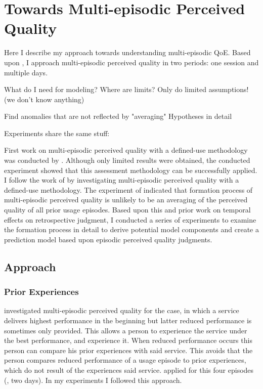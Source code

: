 \chapter{Towards Multi-episodic Perceived Quality}\label{chap:towards}
\begin{chapter-abstract}
Here I describe my approach towards understanding multi-episodic QoE.
Based upon \cite{moller_single-call_2011}, I approach multi-episodic perceived quality in two periods: one session and multiple days.

What do I need for modeling?
Where are limits?
Only do limited assumptions! (we don't know anything)

Find anomalies that are not reflected by "averaging"
Hypotheses in detail

Experiments share the same stuff:
\end{chapter-abstract}

First work on multi-episodic perceived quality with a defined-use methodology was conducted by \cite{moller_single-call_2011}.
Although only limited results were obtained, the conducted experiment showed that this assessment methodology can be successfully applied.
I follow the work of \cite{moller_single-call_2011} by investigating multi-episodic perceived quality with a defined-use methodology.
The experiment of \cite{moller_single-call_2011} indicated that formation process of multi-episodic perceived quality is unlikely to be an averaging of the perceived quality of all prior usage episodes.
Based upon this and prior work on temporal effects on retrospective judgment, I conducted a series of experiments to examine the formation process in detail to derive potential model components and create a prediction model based upon episodic perceived quality judgments.

\section{Approach}
\subsection{Prior Experiences}
\cite{moller_single-call_2011} investigated multi-episodic perceived quality for the case, in which a service delivers highest performance in the beginning but latter reduced performance is sometimes only provided.
This allows a person to experience the service under the best performance, and experience it.
When reduced performance occurs this person can compare his prior experiences with said service.
This avoids that the person compares reduced performance of a usage episode to prior experiences, which do not result of the experiences said service.
\cite{moller_single-call_2011} applied for this four episodes (\ie, two days).
In my experiments I followed this approach.

